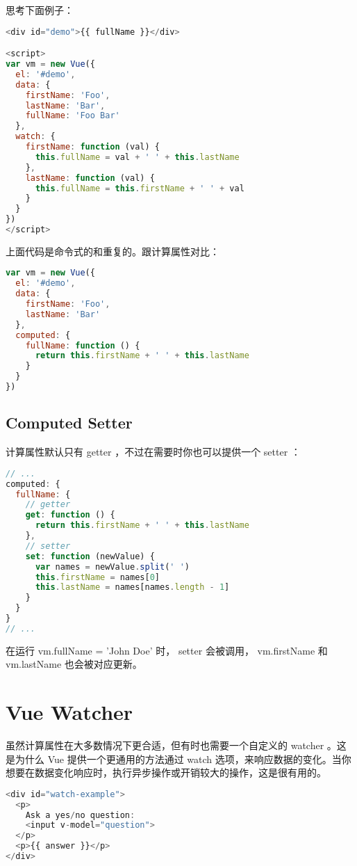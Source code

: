 思考下面例子：

\begin{lstlisting}[language=JavaScript]
<div id="demo">{{ fullName }}</div>

<script>
var vm = new Vue({
  el: '#demo',
  data: {
    firstName: 'Foo',
    lastName: 'Bar',
    fullName: 'Foo Bar'
  },
  watch: {
    firstName: function (val) {
      this.fullName = val + ' ' + this.lastName
    },
    lastName: function (val) {
      this.fullName = this.firstName + ' ' + val
    }
  }
})
</script>
\end{lstlisting}

上面代码是命令式的和重复的。跟计算属性对比：

\begin{lstlisting}[language=JavaScript]
var vm = new Vue({
  el: '#demo',
  data: {
    firstName: 'Foo',
    lastName: 'Bar'
  },
  computed: {
    fullName: function () {
      return this.firstName + ' ' + this.lastName
    }
  }
})
\end{lstlisting}

\section{Computed Setter}

计算属性默认只有 getter ，不过在需要时你也可以提供一个 setter ：


\begin{lstlisting}[language=JavaScript]
// ...
computed: {
  fullName: {
    // getter
    get: function () {
      return this.firstName + ' ' + this.lastName
    },
    // setter
    set: function (newValue) {
      var names = newValue.split(' ')
      this.firstName = names[0]
      this.lastName = names[names.length - 1]
    }
  }
}
// ...
\end{lstlisting}


在运行 vm.fullName = 'John Doe' 时， setter 会被调用， vm.firstName 和 vm.lastName 也会被对应更新。

\chapter{Vue Watcher}


虽然计算属性在大多数情况下更合适，但有时也需要一个自定义的 watcher 。这是为什么 Vue 提供一个更通用的方法通过 watch 选项，来响应数据的变化。当你想要在数据变化响应时，执行异步操作或开销较大的操作，这是很有用的。



\begin{lstlisting}[language=JavaScript]
<div id="watch-example">
  <p>
    Ask a yes/no question:
    <input v-model="question">
  </p>
  <p>{{ answer }}</p>
</div>
\end{lstlisting}



